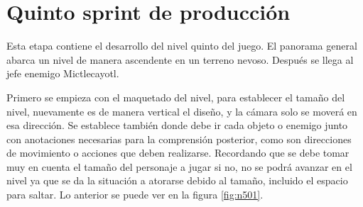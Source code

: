 
\section{Quinto sprint de producción}

Esta etapa contiene el desarrollo del nivel quinto del juego. El panorama general abarca un nivel de manera ascendente en un terreno nevoso. Después se llega al jefe enemigo Mictlecayotl.

Primero se empieza con el maquetado del nivel, para establecer el tamaño del nivel, nuevamente es de manera vertical el diseño, y la cámara solo se moverá en esa dirección. Se establece también donde debe ir cada objeto o enemigo junto con anotaciones necesarias para la comprensión posterior, como son direcciones de movimiento o acciones que deben realizarse. Recordando que se debe tomar muy en cuenta el tamaño del personaje a jugar si no, no se podrá avanzar en el nivel ya que se da la situación a atorarse debido al tamaño, incluido el espacio para saltar. Lo anterior se puede ver en la figura \ref{fig:n501}.

